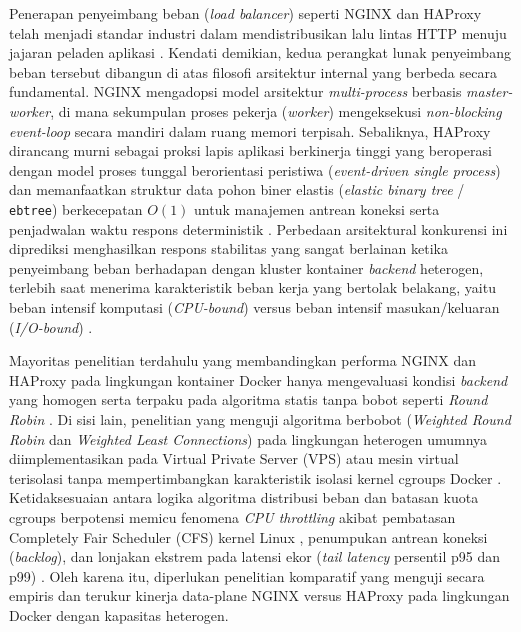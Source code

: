Penerapan penyeimbang beban (\textit{load balancer}) seperti NGINX dan HAProxy telah menjadi standar industri dalam mendistribusikan lalu lintas HTTP menuju jajaran peladen aplikasi \citep{buke2026load, sakib2025dynamic, arini2025perbandingan}. Kendati demikian, kedua perangkat lunak penyeimbang beban tersebut dibangun di atas filosofi arsitektur internal yang berbeda secara fundamental. NGINX mengadopsi model arsitektur \textit{multi-process} berbasis \textit{master-worker}, di mana sekumpulan proses pekerja (\textit{worker}) mengeksekusi \textit{non-blocking event-loop} secara mandiri dalam ruang memori terpisah. Sebaliknya, HAProxy dirancang murni sebagai proksi lapis aplikasi berkinerja tinggi yang beroperasi dengan model proses tunggal berorientasi peristiwa (\textit{event-driven single process}) dan memanfaatkan struktur data pohon biner elastis (\textit{elastic binary tree} / \texttt{ebtree}) berkecepatan $O(1)$ untuk manajemen antrean koneksi serta penjadwalan waktu respons deterministik \citep{tarreau2024haproxy}. Perbedaan arsitektural konkurensi ini diprediksi menghasilkan respons stabilitas yang sangat berlainan ketika penyeimbang beban berhadapan dengan kluster kontainer \textit{backend} heterogen, terlebih saat menerima karakteristik beban kerja yang bertolak belakang, yaitu beban intensif komputasi (\textit{CPU-bound}) versus beban intensif masukan/keluaran (\textit{I/O-bound}) \citep{baeturohman2024analisis}.

Mayoritas penelitian terdahulu yang membandingkan performa NGINX dan HAProxy pada lingkungan kontainer Docker hanya mengevaluasi kondisi \textit{backend} yang homogen serta terpaku pada algoritma statis tanpa bobot seperti \textit{Round Robin} \citep{nurzaman2022analisis, ramadhani2026analysis}. Di sisi lain, penelitian yang menguji algoritma berbobot (\textit{Weighted Round Robin} dan \textit{Weighted Least Connections}) pada lingkungan heterogen umumnya diimplementasikan pada Virtual Private Server (VPS) atau mesin virtual terisolasi tanpa mempertimbangkan karakteristik isolasi kernel cgroups Docker \citep{rizqi2022analisis}. Ketidaksesuaian antara logika algoritma distribusi beban dan batasan kuota cgroups berpotensi memicu fenomena \textit{CPU throttling} akibat pembatasan Completely Fair Scheduler (CFS) kernel Linux \citep{shetty2025cpu}, penumpukan antrean koneksi (\textit{backlog}), dan lonjakan ekstrem pada latensi ekor (\textit{tail latency} persentil p95 dan p99) \citep{wodislawski2026ponytail, li2025tailbench}. Oleh karena itu, diperlukan penelitian komparatif yang menguji secara empiris dan terukur kinerja data-plane NGINX versus HAProxy pada lingkungan Docker dengan kapasitas heterogen.

